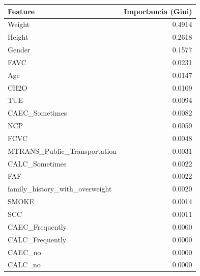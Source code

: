 \begin{tabular}{lr}
\toprule
Feature & Importancia (Gini) \\
\midrule
Weight & 0.4914 \\
Height & 0.2618 \\
Gender & 0.1577 \\
FAVC & 0.0231 \\
Age & 0.0147 \\
CH2O & 0.0109 \\
TUE & 0.0094 \\
CAEC\_Sometimes & 0.0082 \\
NCP & 0.0059 \\
FCVC & 0.0048 \\
MTRANS\_Public\_Transportation & 0.0031 \\
CALC\_Sometimes & 0.0022 \\
FAF & 0.0022 \\
family\_history\_with\_overweight & 0.0020 \\
SMOKE & 0.0014 \\
SCC & 0.0011 \\
CAEC\_Frequently & 0.0000 \\
CALC\_Frequently & 0.0000 \\
CAEC\_no & 0.0000 \\
CALC\_no & 0.0000 \\
\bottomrule
\end{tabular}
